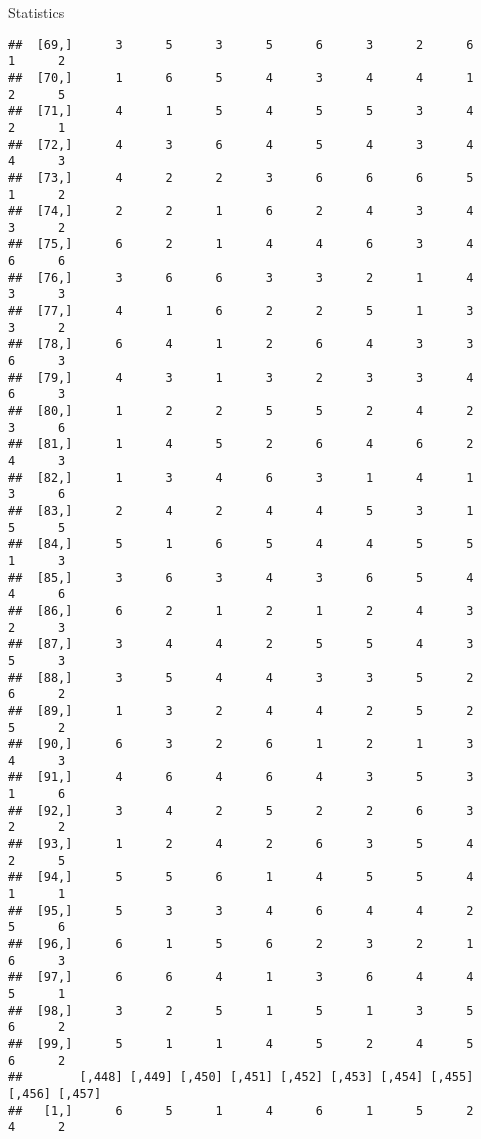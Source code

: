 \documentclass[
  ignorenonframetext,
]{beamer}
\begin{document}
\begin{frame}[fragile]{Statistics}
\begin{verbatim}
##  [69,]      3      5      3      5      6      3      2      6      1      2
##  [70,]      1      6      5      4      3      4      4      1      2      5
##  [71,]      4      1      5      4      5      5      3      4      2      1
##  [72,]      4      3      6      4      5      4      3      4      4      3
##  [73,]      4      2      2      3      6      6      6      5      1      2
##  [74,]      2      2      1      6      2      4      3      4      3      2
##  [75,]      6      2      1      4      4      6      3      4      6      6
##  [76,]      3      6      6      3      3      2      1      4      3      3
##  [77,]      4      1      6      2      2      5      1      3      3      2
##  [78,]      6      4      1      2      6      4      3      3      6      3
##  [79,]      4      3      1      3      2      3      3      4      6      3
##  [80,]      1      2      2      5      5      2      4      2      3      6
##  [81,]      1      4      5      2      6      4      6      2      4      3
##  [82,]      1      3      4      6      3      1      4      1      3      6
##  [83,]      2      4      2      4      4      5      3      1      5      5
##  [84,]      5      1      6      5      4      4      5      5      1      3
##  [85,]      3      6      3      4      3      6      5      4      4      6
##  [86,]      6      2      1      2      1      2      4      3      2      3
##  [87,]      3      4      4      2      5      5      4      3      5      3
##  [88,]      3      5      4      4      3      3      5      2      6      2
##  [89,]      1      3      2      4      4      2      5      2      5      2
##  [90,]      6      3      2      6      1      2      1      3      4      3
##  [91,]      4      6      4      6      4      3      5      3      1      6
##  [92,]      3      4      2      5      2      2      6      3      2      2
##  [93,]      1      2      4      2      6      3      5      4      2      5
##  [94,]      5      5      6      1      4      5      5      4      1      1
##  [95,]      5      3      3      4      6      4      4      2      5      6
##  [96,]      6      1      5      6      2      3      2      1      6      3
##  [97,]      6      6      4      1      3      6      4      4      5      1
##  [98,]      3      2      5      1      5      1      3      5      6      2
##  [99,]      5      1      1      4      5      2      4      5      6      2
##        [,448] [,449] [,450] [,451] [,452] [,453] [,454] [,455] [,456] [,457]
##   [1,]      6      5      1      4      6      1      5      2      4      2

\end{verbatim}
\end{frame}
\end{document}

